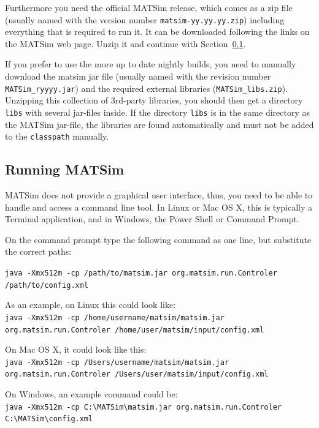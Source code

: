 Furthermore you need the official MATSim release, which comes as a zip file (usually named with the version number \lstinline|matsim-yy.yy.yy.zip|) including everything that is required to run it. It can be downloaded following the links on the MATSim web page. Unzip it and continue with Section~\ref{sec:runexample}.

If you prefer to use the more up to date nightly builds, you need to manually download the matsim jar file (usually named with the revision number \lstinline|MATSim_ryyyy.jar|) and the required external libraries (\lstinline|MATSim_libs.zip|). Unzipping this collection of 3rd-party libraries, you should then get a directory \lstinline|libs| with several jar-files inside. If the directory \lstinline|libs| is in the same directory as the MATSim jar-file, the libraries are found automatically and must not be added to the \lstinline|classpath| manually.

\subsection{Running MATSim}
\label{sec:runexample}
MATSim does not provide a graphical user interface, thus, you need to be able to handle and access a command line tool. In Linux or Mac OS X, this is typically a Terminal application, and in Windows, the Power Shell or Command Prompt.

On the command prompt type the following command as one line, but substitute the correct paths: 

\lstinline|java -Xmx512m -cp /path/to/matsim.jar org.matsim.run.Controler /path/to/config.xml|

As an example, on Linux this could look like: \\
\lstinline|java -Xmx512m -cp /home/username/matsim/matsim.jar org.matsim.run.Controler /home/user/matsim/input/config.xml|

On Mac OS X, it could look like this: \\
\lstinline|java -Xmx512m -cp /Users/username/matsim/matsim.jar org.matsim.run.Controler /Users/user/matsim/input/config.xml|

On Windows, an example command could be: \\
\lstinline|java -Xmx512m -cp C:\MATSim\matsim.jar org.matsim.run.Controler C:\MATSim\config.xml|

